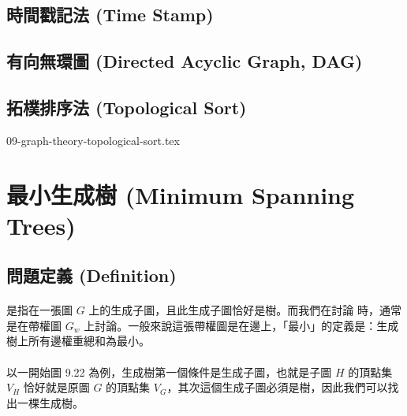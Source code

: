 \documentclass[12pt,a4paper,oneside]{report}
\begin{document}
\begin{CJK}{UTF8}{bkai}
\subsection{時間戳記法 (Time Stamp)}
\subsection{有向無環圖 (Directed Acyclic Graph, DAG)}
\subsection{拓樸排序法 (Topological Sort)}

{09-graph-theory-topological-sort.tex}

\section{最小生成樹 (Minimum Spanning Trees)}

\subsection{問題定義 (Definition)}
\paragraph{} 是指在一張圖 $G$ 上的生成子圖，且此生成子圖恰好是樹。而我們在討論\textbf{} 時，通常是在帶權圖 $G_w$ 上討論。一般來說這張帶權圖是在邊上，「最小」的定義是：生成樹上所有邊權重總和為最小。
\paragraph{}以一開始圖 9.22 為例，生成樹第一個條件是生成子圖，也就是子圖 $H$ 的頂點集 $V_H$ 恰好就是原圖 $G$ 的頂點集 $V_G$，其次這個生成子圖必須是樹，因此我們可以找出一棵生成樹。


\end{CJK}
\end{document}
